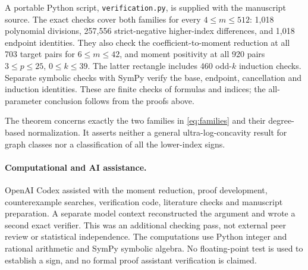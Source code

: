 \documentclass[11pt]{article}
\begin{document}
A portable Python script, \texttt{verification.py}, is supplied with
the manuscript source. The exact checks cover both families for every
$4\le m\le512$: 1,018 polynomial divisions, 257,556 strict-negative
higher-index differences, and 1,018 endpoint identities. They also
check the coefficient-to-moment reduction at all 703 target pairs for
$6\le m\le42$, and moment positivity at all 920 pairs
$3\le p\le25$, $0\le k\le39$. The latter rectangle includes 460
odd-$k$ induction checks. Separate symbolic checks with SymPy
\cite{Meurer2017} verify the base, endpoint, cancellation and
induction identities. These are finite checks of formulas and indices;
the all-parameter conclusion follows from the proofs above.

The theorem concerns exactly the two families in \eqref{eq:families}
and their degree-based normalization. It asserts neither a general
ultra-log-concavity result for graph classes nor a classification of
all the lower-index signs.

\paragraph{Computational and AI assistance.}
OpenAI Codex assisted with the moment reduction, proof development,
counterexample searches, verification code, literature checks and
manuscript preparation. A separate model context reconstructed the
argument and wrote a second exact verifier. This was an additional
checking pass, not external peer review or statistical independence.
The computations use Python integer and rational arithmetic and SymPy
symbolic algebra. No floating-point test is used to establish a sign,
and no formal proof assistant verification is claimed.



\end{document}
